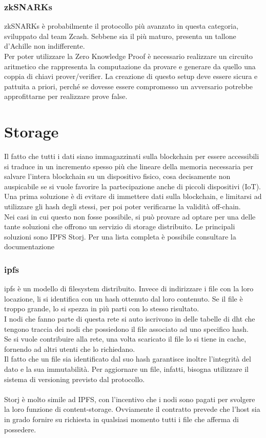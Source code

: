 \documentclass[12pt, letterpaper, twoside]{article}
\begin{document}
\subsubsection{zkSNARKs}
zkSNARKs è probabilmente il protocollo più avanzato in questa categoria, sviluppato dal team Zcash. Sebbene sia il più maturo, presenta un tallone d'Achille non indifferente. \\
Per poter utilizzare la Zero Knowledge Proof è necessario realizzare un circuito aritmetico che rappresenta la computazione da provare e generare da quello una coppia di chiavi prover/verifier.
La creazione di questo setup deve essere sicura e pattuita a priori, perché se dovesse essere compromesso un avversario potrebbe approfittarne per realizzare prove false.

\newpage

\section{Storage}
Il fatto che tutti i dati siano immagazzinati sulla blockchain per essere accessibili si traduce in un incremento spesso più che lineare della memoria necessaria per salvare l'intera blockchain su un dispositivo fisico, cosa decisamente non auspicabile se si vuole favorire la partecipazione anche di piccoli dispositivi (IoT). \\
Una prima soluzione è di evitare di immettere dati sulla blockchain, e limitarsi ad utilizzare gli hash degli stessi, per poi poter verificarne la validità off-chain. \\
Nei casi in cui questo non fosse possibile, si può provare ad optare per una delle tante soluzioni che offrono un servizio di storage distribuito.
Le principali soluzioni sono IPFS Storj.
Per una lista completa è possibile consultare la documentazione \cite{wiki:ew-storage}

\subsubsection{\gls{ipfs}}
\gls{ipfs} è un modello di filesystem distribuito.
Invece di indirizzare i file con la loro locazione, li si identifica con un hash ottenuto dal loro contenuto.
Se il file è troppo grande, lo si spezza in più parti con lo stesso risultato. \\
I nodi che fanno parte di questa rete si auto iscrivono in delle tabelle di \gls{dht} che tengono traccia dei nodi che possiedono il file associato ad uno specifico hash. \\
Se si vuole contribuire alla rete, una volta scaricato il file lo si tiene in cache, fornendo ad altri utenti che lo richiedano. \\
Il fatto che un file sia identificato dal suo hash garantisce inoltre l'integrità del dato e la sua immutabilità.
Per aggiornare un file, infatti, bisogna utilizzare il sistema di versioning previsto dal protocollo. \\ \\
Storj è molto simile ad IPFS, con l'incentivo che i nodi sono pagati per svolgere la loro funzione di content-storage.
Ovviamente il contratto prevede che l'host sia in grado fornire su richiesta in qualsiasi momento tutti i file che afferma di possedere.
\end{document}
